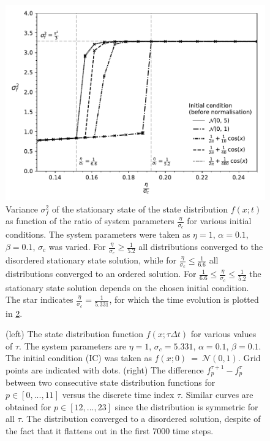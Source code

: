 \begin{figure}[tbp]
	\centering
	\includegraphics[width=0.7\linewidth]{figures/cont_closure_variance_vs_etaoversigma}%
	\caption{Variance $\sigma_f^2$ of the stationary state of the state distribution $f(x;t)$ as function of the ratio of system parameters $\frac{\eta}{\sigma_c}$ for various initial conditions. The system parameters were taken as $\eta=1$, $\alpha=0.1$,  $\beta=0.1$, $\sigma_c$ was varied. For $\frac{\eta}{\sigma_c}\ge\frac{1}{5.2}$ all distributions converged to the disordered stationary state solution, while for $\frac{\eta}{\sigma_c}\le\frac{1}{6.6}$ all distributions converged to an ordered solution. For $\frac{1}{6.6}\le\frac{\eta}{\sigma_c}\le\frac{1}{5.2}$ the stationary state solution depends on the chosen initial condition. The star indicates $\frac{\eta}{\sigma_c} = \frac{1}{5.331}$, for which the time evolution is plotted in \cref{fig:cont_closure_saddle_IC1_s5331}.}
	\label{fig:cont_closure_variance_vs_sigma}
\end{figure}

\begin{figure}[tbp]
	\centering
	\caption{(left) The state distribution function $f(x;\tau \Delta t)$ for various values of $\tau$. The system parameters are $\eta=1$, $\sigma_c =5.331$, $\alpha=0.1$, $\beta=0.1$. The initial condition (IC) was taken as $f(x;0)~=~\mathcal{N}(0,1)$. Grid points are indicated with dots. (right) The difference $f_p^{\tau+1}-f_p^\tau$ between two consecutive state distribution functions for $p\in [0,...,11]$ versus the discrete time index $\tau$. Similar curves are obtained for $p\in [12,...,23]$ since the distribution is symmetric for all $\tau$. The distribution converged to a disordered solution, despite of the fact that it flattens out in the first 7000 time steps. }
	\label{fig:cont_closure_saddle_IC1_s5331}
\end{figure}


